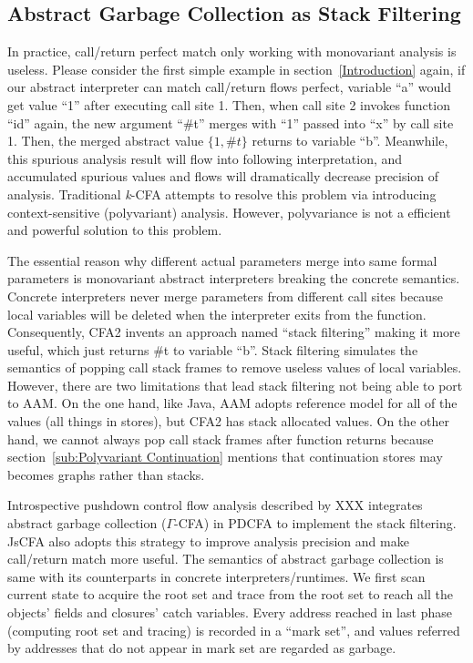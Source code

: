 \documentclass{article}
\begin{document}
\subsection{Abstract Garbage Collection as Stack Filtering}
\label{sub:Abstract Garbage Collection as Stack Filtering}
In practice, call/return perfect match only working with monovariant analysis is useless. Please consider the first simple example in section~\ref{Introduction} again, if our abstract interpreter can match call/return flows perfect, variable ``a'' would get value ``1'' after executing call site 1. Then, when call site 2 invokes function ``id'' again, the new argument ``\#t'' merges with ``1'' passed into ``x'' by call site 1. Then, the merged abstract value $\{1, \#t\}$ returns to variable ``b''.
Meanwhile, this spurious analysis result will flow into following interpretation, and accumulated spurious values and flows will dramatically decrease precision of analysis.
Traditional \textit{k}-CFA attempts to resolve this problem via introducing context-sensitive (polyvariant) analysis. However, polyvariance is not a efficient and powerful solution to this problem.

The essential reason why different actual parameters merge into same formal parameters is monovariant abstract interpreters breaking the concrete semantics. Concrete interpreters never merge parameters from different call sites because local variables will be deleted when the interpreter exits from the function.
Consequently, CFA2 invents an approach named ``stack filtering'' making it more useful, which just returns \#t to variable ``b''. Stack filtering simulates the semantics of popping call stack frames to remove useless values of local variables. However, there are two limitations that lead stack filtering not being able to port to AAM\@. On the one hand, like Java, AAM adopts reference model for all of the values (all things in stores), but CFA2 has stack allocated values. On the other hand, we cannot always pop call stack frames after function returns because section~\ref{sub:Polyvariant Continuation} mentions that continuation stores may becomes graphs rather than stacks.

Introspective pushdown control flow analysis described by XXX integrates abstract garbage collection ($\Gamma$-CFA) in PDCFA to implement the stack filtering. JsCFA also adopts this strategy to improve analysis precision and make call/return match more useful. The semantics of abstract garbage collection is same with its counterparts in concrete interpreters/runtimes.
We first scan current state to acquire the root set and trace from the root set to reach all the objects' fields and closures' catch variables. Every address reached in last phase (computing root set and tracing) is recorded in a ``mark set'', and values referred by addresses that do not appear in mark set are regarded as garbage.
\end{document}
